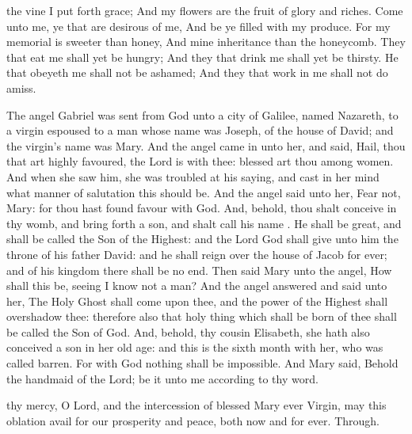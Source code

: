  the vine I put forth grace; And my flowers are the fruit of glory and riches. Come unto me, ye that are desirous of me, And be ye filled with my produce. For my memorial is sweeter than honey, And mine inheritance than the honeycomb. They that eat me shall yet be hungry; And they that drink me shall yet be thirsty. He that obeyeth me shall not be ashamed; And they that work in me shall not do amiss.


 The angel Gabriel was sent from God unto a city of Galilee, named Nazareth, to a virgin espoused to a man whose name was Joseph, of the house of David; and the virgin’s name was Mary. And the angel came in unto her, and said, Hail, thou that art highly favoured, the Lord is with thee: blessed art thou among women. And when she saw him, she was troubled at his saying, and cast in her mind what manner of salutation this should be. And the angel said unto her, Fear not, Mary: for thou hast found favour with God. And, behold, thou shalt conceive in thy womb, and bring forth a son, and shalt call his name . He shall be great, and shall be called the Son of the Highest: and the Lord God shall give unto him the throne of his father David: and he shall reign over the house of Jacob for ever; and of his kingdom there shall be no end. Then said Mary unto the angel, How shall this be, seeing I know not a man? And the angel answered and said unto her, The Holy Ghost shall come upon thee, and the power of the Highest shall overshadow thee: therefore also that holy thing which shall be born of thee shall be called the Son of God. And, behold, thy cousin Elisabeth, she hath also conceived a son in her old age: and this is the sixth month with her, who was called barren. For with God nothing shall be impossible. And Mary said, Behold the handmaid of the Lord; be it unto me according to thy word.


\secret
{} thy mercy, O Lord, and the intercession of blessed Mary ever Virgin, may this oblation avail for our prosperity and peace, both now and for ever. Through.

